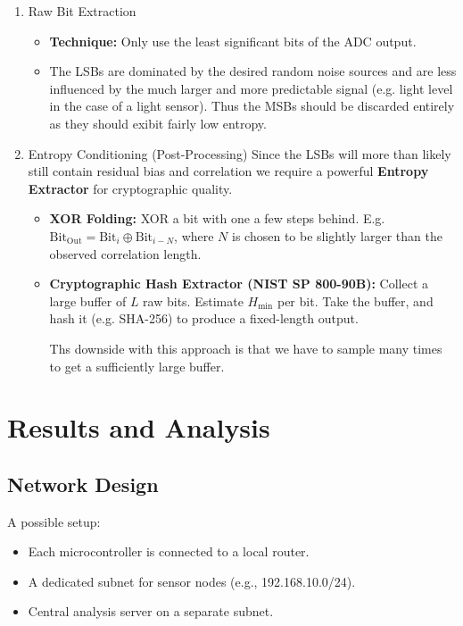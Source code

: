 \begin{enumerate}
    \item Raw Bit Extraction 
        \begin{itemize}
            \item \textbf{Technique:} Only use the least significant
                bits of the ADC output. 
            \item The LSBs are dominated by the desired random noise 
                sources and are less influenced by the much larger 
                and more predictable signal 
                (e.g. light level in the case of a light sensor).
                Thus the MSBs should be discarded entirely as they 
                should exibit fairly low entropy.
        \end{itemize}

    \item Entropy Conditioning (Post-Processing) 
        Since the LSBs will more than likely still contain 
        residual bias and correlation we require a powerful 
        \textbf{Entropy Extractor} for cryptographic quality.
        \begin{itemize}
            \item \textbf{XOR Folding:}
                XOR a bit with one a few steps behind. 
                E.g. $\text{Bit}_{\text{Out}} = 
                \text{Bit}_i \oplus \text{Bit}_{i-N}$, 
                where $N$ is chosen to be slightly larger than 
                the observed correlation length.

            \item \textbf{Cryptographic Hash Extractor 
                (NIST SP 800-90B):}
                Collect a large buffer of $L$ raw bits. 
                Estimate $H_{\text{min}}$ per bit. Take the buffer, 
                and hash it (e.g. SHA-256) to produce a fixed-length 
                output.

                Ths downside with this approach is that we have to 
                sample many times to get a sufficiently large buffer.
        \end{itemize}
\end{enumerate}



\newpage
\section{Results and Analysis}

\subsection{Network Design}
A possible setup:
\begin{itemize}
    \item Each microcontroller is connected to a local router.
    \item A dedicated subnet for sensor nodes (e.g., 192.168.10.0/24).
    \item Central analysis server on a separate subnet.
\end{itemize}

